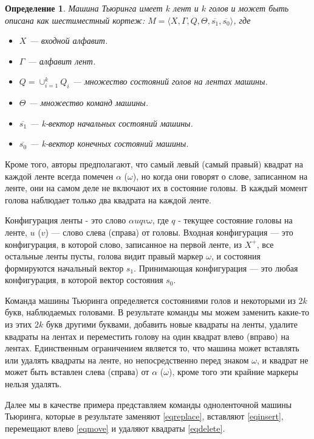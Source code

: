 \documentclass[14pt]{matmex-diploma-custom}
\newtheorem{defn}{Определение}[subsection]
\begin{document}
\begin{defn} \label{tm}
Машина Тьюринга имеет $ k $ лент и $ k $ голов и может быть описана как шестиместный кортеж:
$M = \langle X, \Gamma, Q, \Theta, \overline{s_1}, \overline{s_0} \rangle$,
где
\begin{itemize}
    \item $X$ --- входной алфавит.
    \item $\Gamma$ --- алфавит лент.
    \item $Q = \cup_{i=1}^k Q_i$ --- множество состояний голов на лентах машины.
    \item $\Theta$ --- множество команд машины.
    \item $\overline{s_1}$ --- k-вектор начальных состояний машины.
    \item $\overline{s_0}$ --- k-вектор конечных состояний машины.
\end{itemize}
\end{defn}

Кроме того, авторы предполагают, что самый левый (самый правый) квадрат на каждой ленте всегда помечен
$ \alpha $ ($ \omega $), но когда они говорят о слове, записанном на ленте,
они на самом деле не включают их в состояние головы. В каждый момент голова
наблюдает только два квадрата на каждой ленте.

Конфигурация ленты - это слово $ \alpha u q v \omega $, где $ q $ - текущее состояние головы на ленте, 
$u$ ($ v $) --- слово слева (справа) от головы. 
Входная конфигурация --- это конфигурация, в которой слово, записанное на первой ленте, из
$X^+$, все остальные ленты пусты, голова видит правый маркер $\omega$, и состояния формируются
начальный вектор $s_1$. Принимающая конфигурация --- это любая конфигурация, в которой вектор состояния
$s_0$. 

Команда машины Тьюринга определяется состояниями голов и некоторыми из
$ 2k $ букв, наблюдаемых головами.
В результате команды мы можем заменить какие-то из этих $ 2k $ букв другими буквами,
добавить новые квадраты на ленты, удалите квадраты на лентах и переместить
голову на один квадрат влево (вправо) на лентах.
Единственным ограничением является то, что машина может вставлять или удалять квадраты на ленте,
но непосредственно перед знаком $ \omega $, и квадрат не может быть вставлен слева (справа) от
$ \alpha $ ($ \omega $), кроме того эти крайние маркеры нельзя удалять.

Далее мы в качестве примера представляем команды одноленточной машины Тьюринга, 
которые в результате заменяют \eqref{eqreplace},
вставляют \eqref{eqinsert}, перемещают влево \eqref{eqmove} и удаляют квадраты \eqref{eqdelete}.
\end{document}
